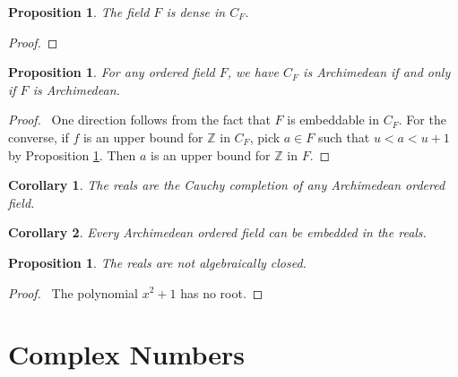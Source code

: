 \documentclass{article}
\let\qed\relax
\newtheorem{proposition}[axiom]{Proposition}
\newtheorem{corollary}{Corollary}[axiom]
\theoremstyle{definition}
\begin{document}
    \begin{proposition}
        \label{proposition:F_dense}
        The field $F$ is dense in $C_F$.
    \end{proposition}

    \begin{proof}
        \pf
        \qed
    \end{proof}

    \begin{proposition}
        For any ordered field $F$, we have $C_F$ is Archimedean if and only if $F$ is Archimedean.
    \end{proposition}

    \begin{proof}
        \pf\ One direction follows from the fact that $F$ is embeddable in $C_F$. For the converse, if $f$ is an upper bound for
        $\mathbb{Z}$ in $C_F$, pick $a \in F$ such that $u < a < u + 1$ by Proposition \ref{proposition:F_dense}. Then $a$ is an upper
        bound for $\mathbb{Z}$ in $F$. \qed
    \end{proof}

    \begin{corollary}
        The reals are the Cauchy completion of any Archimedean ordered field.
    \end{corollary}

    \begin{corollary}
        Every Archimedean ordered field can be embedded in the reals.
    \end{corollary}

    \begin{proposition}
        The reals are not algebraically closed.
    \end{proposition}

    \begin{proof}
        \pf\ The polynomial $x^2 + 1$ has no root. \qed
    \end{proof}

    \section{Complex Numbers}
\end{document}
